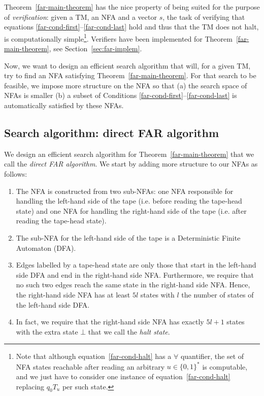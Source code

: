 \begin{remark}[Verification]\normalfont\label{far-remark-verification}
  Theorem~\ref{far-main-theorem} has the nice property of being suited for the purpose of \textit{verification}: given a TM, an NFA and a vector $s$, the task of verifying that equations \eqref{far-cond-first}--\eqref{far-cond-last} hold and thus that the TM does not halt, is computationally simple\footnote{Note that although equation~\eqref{far-cond-halt} has a $\forall$ quantifier, the set of NFA states reachable after reading an arbitrary $u \in \{0,1\}^*$ is computable, and we just have to consider one instance of equation~\eqref{far-cond-halt} replacing $q_0 T_u$ per such state.}. Verifiers have been implemented for Theorem~\ref{far-main-theorem}, see Section~\ref{sec:far-implem}.
\end{remark}


Now, we want to design an efficient search algorithm that will, for a given TM, try to find an NFA satisfying Theorem~\ref{far-main-theorem}. For that search to be feasible, we impose more structure on the NFA so that (a) the search space of NFAs is smaller (b) a subset of Conditions \eqref{far-cond-first}--\eqref{far-cond-last} is automatically satisfied by these NFAs.


\subsection{Search algorithm: direct FAR algorithm}
\label{far-algo-direct}

We design an efficient search algorithm for Theorem~\ref{far-main-theorem} that we call the \textit{direct FAR algorithm}. We start by adding more structure to our NFAs as follows:


\begin{enumerate}

  \item The NFA is constructed from two sub-NFAs: one NFA responsible for handling the left-hand side of the tape (i.e. before reading the tape-head state) and one NFA for handling the right-hand side of the tape (i.e. after reading the tape-head state).
  \item The sub-NFA for the left-hand side of the tape is a Deterministic Finite Automaton (DFA).
  \item Edges labelled by a tape-head state are only those that start in the left-hand side DFA and end in the right-hand side NFA. Furthermore, we require that no such two edges reach the same state in the right-hand side NFA. Hence, the right-hand side NFA has at least $5l$ states with $l$ the number of states of the left-hand side DFA.\label{pt:injective}
  \item In fact, we require that the right-hand side NFA has exactly $5l+1$ states with the extra state $\bot$ that we call the \textit{halt state}.

\end{enumerate}

